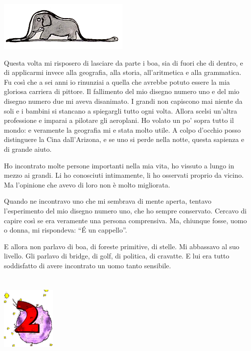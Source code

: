 \documentclass[11pt]{scrbook}
\begin{document}
\begin{center}
\includegraphics{./img/boa.png}
\end{center}

Questa volta mi risposero di lasciare da parte i boa, sia di fuori che
di dentro, e di applicarmi invece alla geografia, alla storia,
all'aritmetica e alla grammatica. Fu così che a sei anni io rinunziai a
quella che avrebbe potuto essere la mia gloriosa carriera di pittore. Il
fallimento del mio disegno numero uno e del mio disegno numero due mi
aveva disanimato. I grandi non capiscono mai niente da soli e i bambini
si stancano a spiegargli tutto ogni volta. Allora scelsi un'altra
professione e imparai a pilotare gli aeroplani. Ho volato un po' sopra
tutto il mondo: e veramente la geografia mi e stata molto utile. A colpo
d'occhio posso distinguere la Cina dall'Arizona, e se uno si perde nella
notte, questa sapienza e di grande aiuto.

Ho incontrato molte persone importanti nella mia vita, ho vissuto a
lungo in mezzo ai grandi. Li ho conosciuti intimamente, li ho osservati
proprio da vicino. Ma l'opinione che avevo di loro non è molto
migliorata.

Quando ne incontravo uno che mi sembrava di mente aperta, tentavo
l'esperimento del mio disegno numero uno, che ho sempre conservato.
Cercavo di capire così se era veramente una persona comprensiva. Ma,
chiunque fosse, uomo o donna, mi rispondeva: ``É un cappello''.

E allora non parlavo di boa, di foreste primitive, di stelle. Mi
abbassavo al suo livello. Gli parlavo di bridge, di golf, di politica,
di cravatte. E lui era tutto soddisfatto di avere incontrato un uomo
tanto sensibile.

\chapter{}
\begin{center}
\includegraphics{./img/chapter2.png}
\end{center}
\end{document}
